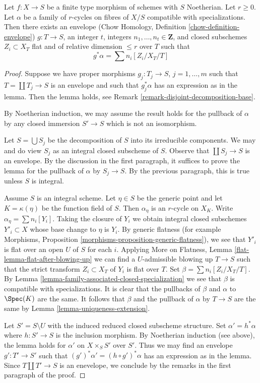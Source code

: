 \begin{lemma}
\label{lemma-get-cycles}
Let $f : X \to S$ be a finite type morphism of schemes with $S$ Noetherian.
Let $r \geq 0$. Let $\alpha$ be a family of $r$-cycles on fibres of $X/S$
compatible with specializations. Then there exists an envelope
(Chow Homology, Definition \ref{chow-definition-envelope})
$g : T \to S$, an integer $t$, integers
$n_1, \ldots, n_t \in \mathbf{Z}$, and closed subschemes
$Z_i \subset X_T$ flat and of relative dimension $\leq r$ over $T$ such that
$$
g^*\alpha = \sum n_i [Z_i/X_T/T]
$$
\end{lemma}

\begin{proof}
Suppose we have proper morphisms $g_j : T_j \to S$, $j = 1, \ldots, m$
such that $T = \coprod T_j \to S$ is an envelope and
such that $g_j^*\alpha$ has an expression as in the lemma.
Then the lemma holds, see
Remark \ref{remark-disjoint-decomposition-base}.

\medskip\noindent
By Noetherian induction, we may assume the result holds for
the pullback of $\alpha$ by any closed immersion $S' \to S$
which is not an isomorphism.

\medskip\noindent
Let $S = \bigcup S_j$ be the decomposition of $S$ into its irreducible
components. We may and do view $S_j$ as an integral closed subscheme of $S$.
Observe that $\coprod S_j \to S$ is an envelope.
By the discussion in the first paragraph, it suffices to prove
the lemma for the pullback of $\alpha$ by $S_j \to S$.
By the previous paragraph, this is true unless $S$
is integral.

\medskip\noindent
Assume $S$ is an integral scheme. Let $\eta \in S$ be the generic point
and let $K = \kappa(\eta)$ be the function field of $S$.
Then $\alpha_\eta$ is an $r$-cycle on $X_K$.
Write $\alpha_\eta = \sum n_i[Y_i]$.
Taking the closure of $Y_i$ we obtain integral closed subschemes
$Y'_i \subset X$ whose base change to $\eta$ is $Y_i$.
By generic flatness (for example Morphisms,
Proposition \ref{morphisms-proposition-generic-flatness}),
we see that $Y'_i$ is flat over an open $U$ of $S$ for each $i$.
Applying More on Flatness, Lemma \ref{flat-lemma-flat-after-blowing-up}
we can find a $U$-admissible blowing up $T \to S$
such that the strict transform $Z_i \subset X_T$ of $Y_i$ is flat over $T$.
Set $\beta = \sum n_i[Z_i/X_T/T]$. By
Lemma \ref{lemma-family-associated-closed-specialization}
we see that $\beta$ is compatible with specializations.
It is clear that the pullbacks of $\beta$ and $\alpha$
to $\Spec(K)$ are the same. It follows that $\beta$ and the pullback of
$\alpha$ by $T \to S$ are the same by Lemma \ref{lemma-uniqueness-extension}.

\medskip\noindent
Let $S' = S \setminus U$ with the induced reduced closed subscheme structure.
Set $\alpha' = h^*\alpha$ where $h : S' \to S$ is the inclusion morphism.
By Noetherian induction (see above), the lemma holds for
$\alpha'$ on $X \times_S S'$ over $S'$.
Thus we may find an envelope $g' : T' \to S'$ such that
$(g')^*\alpha' = (h \circ g')^*\alpha$ has an expression as in
the lemma. Since $T \amalg T' \to S$ is an enevelope, we conclude
by the remarks in the first paragraph of the proof.
\end{proof}
